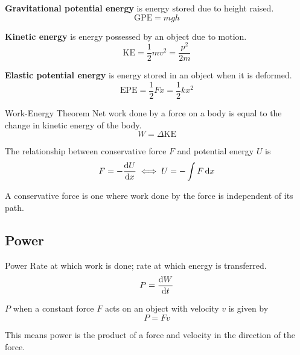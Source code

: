 \textbf{Gravitational potential energy} is energy stored due to height raised.
\begin{equation}
\mathrm{GPE} = mgh
\end{equation}


\textbf{Kinetic energy} is energy possessed by an object due to motion.
\begin{equation} 
\mathrm{KE} = \frac{1}{2}mv^2 = \frac{p^2}{2m} 
\end{equation}


\textbf{Elastic potential energy} is energy stored in an object when it is deformed.
\begin{equation}
\mathrm{EPE} = \frac{1}{2} Fx = \frac{1}{2} k x^2 
\end{equation}

\begin{defn}{Work-Energy Theorem}{}
Net work done by a force on a body is equal to the change in kinetic energy of the body.
\begin{equation} W = \Delta \mathrm{KE} \end{equation}
\end{defn} 

The relationship between conservative force $F$ and potential energy $U$ is
\begin{equation} F = -\dv{U}{x} \iff U = -\int F \dd{x} \end{equation}
\begin{remark}
A conservative force is one where work done by the force is independent of its path.
\end{remark}
\pagebreak

\subsection{Power}
\begin{defn}{Power}{}
Rate at which work is done; rate at which energy is transferred.
\begin{equation}
P = \dv{W}{t}
\end{equation}
\end{defn}

 $P$ when a constant force $F$ acts on an object with velocity $v$ is given by
\begin{equation} P = Fv \end{equation}
\begin{remark}
This means power is the product of a force and velocity in the direction of the force.
\end{remark}


